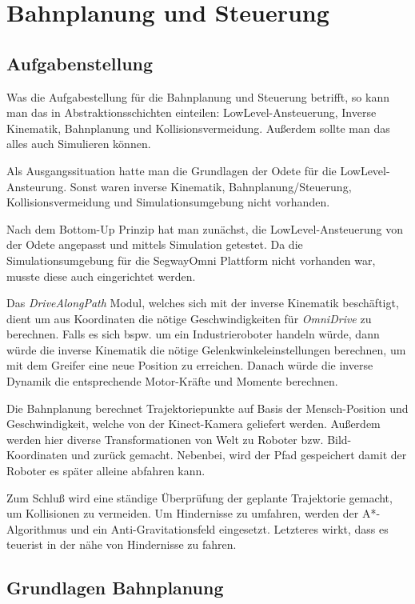 
\chapter{Bahnplanung und Steuerung}


\section{Aufgabenstellung}

Was die Aufgabestellung für die Bahnplanung und Steuerung betrifft, so kann man das in Abstraktionsschichten einteilen: LowLevel-Ansteuerung, Inverse Kinematik, Bahnplanung und Kollisionsvermeidung. Außerdem sollte man das alles auch Simulieren können.

Als Ausgangssituation hatte man die Grundlagen der Odete für die LowLevel-Ansteurung. Sonst waren inverse Kinematik, Bahnplanung/Steuerung, Kollisionsvermeidung und Simulationsumgebung nicht vorhanden.

Nach dem Bottom-Up Prinzip hat man zunächst, die LowLevel-Ansteuerung von der Odete angepasst und mittels Simulation getestet. Da die Simulationsumgebung für die SegwayOmni Plattform nicht vorhanden war, musste diese auch eingerichtet werden.

Das \textit{DriveAlongPath} Modul, welches sich mit der inverse Kinematik beschäftigt, dient um aus Koordinaten die nötige Geschwindigkeiten für \textit{OmniDrive} zu berechnen. Falls es sich bspw. um ein Industrieroboter handeln würde, dann würde die inverse Kinematik die nötige Gelenkwinkeleinstellungen berechnen, um mit dem Greifer eine neue Position zu erreichen. Danach würde die inverse Dynamik die entsprechende Motor-Kräfte und Momente berechnen.

Die Bahnplanung berechnet Trajektoriepunkte auf Basis der Mensch-Position und Geschwindigkeit, welche von der Kinect-Kamera geliefert werden. Außerdem werden hier diverse Transformationen von Welt zu Roboter bzw. Bild-Koordinaten und zurück gemacht. Nebenbei, wird der Pfad gespeichert damit der Roboter es später alleine abfahren kann.

Zum Schluß wird eine ständige Überprüfung der geplante Trajektorie gemacht, um Kollisionen zu vermeiden. Um Hindernisse zu umfahren, werden der A*-Algorithmus und ein Anti-Gravitationsfeld eingesetzt. Letzteres wirkt, dass es \glqq teuer\grqq \space ist in der nähe von Hindernisse zu fahren.




\section{Grundlagen Bahnplanung}



